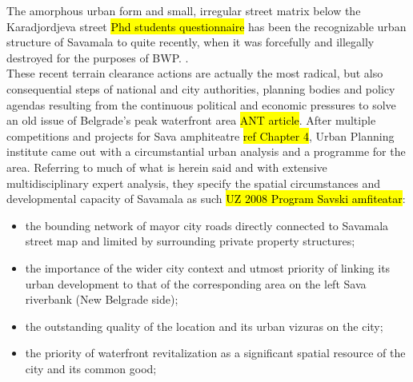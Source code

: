 \documentclass[11pt]{report}
\begin{document}
The amorphous urban form and small, irregular street matrix below the Karadjordjeva street \hl{Phd students questionnaire} has been the recognizable urban structure of Savamala to quite recently, when it was forcefully and illegally destroyed for the purposes of BWP. \footnotemark
{}.
\\
These recent terrain clearance actions are actually the most radical, but also consequential steps of national and city authorities, planning bodies and policy agendas resulting from the continuous political and economic pressures to solve an old issue of Belgrade’s peak waterfront area \hl{ANT article}. \footnotemark
After multiple competitions and projects for Sava amphiteatre \hl{ref Chapter 4}, Urban Planning institute came out with a circumstantial urban analysis and a programme for the area. Referring to much of what is herein said and with extensive multidisciplinary expert analysis, they specify the spatial circumstances and developmental capacity of Savamala as such \hl{UZ 2008 Program Savski amfiteatar}:
\begin{itemize}
\item the bounding network of mayor city roads directly connected to Savamala street map and limited by surrounding private property structures;
\item the importance of the wider city context and utmost priority of linking its urban development to that of the corresponding area on the left Sava riverbank (New Belgrade side);
\item the outstanding quality of the location and its urban vizuras on the city;
\item the priority of waterfront revitalization as a significant spatial resource of the city and its common good;
\end{itemize}
\end{document}

